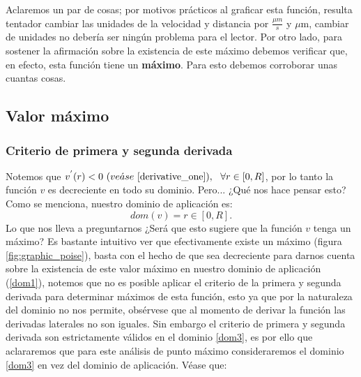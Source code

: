 Aclaremos un par de cosas; por motivos prácticos al graficar esta función, resulta tentador cambiar las unidades de la velocidad y distancia por $\frac{\mu m}{s}$ y $\mu$m, cambiar de unidades no debería ser ningún problema para el lector. Por otro lado, para sostener la  afirmación sobre la existencia de este máximo debemos verificar que, en efecto, esta función tiene un \textbf{máximo}. Para esto debemos corroborar unas cuantas cosas.\\
\subsection{Valor máximo}
\subsubsection{Criterio de primera y segunda derivada}

   \vspace{0.5cm}

Notemos que $v^{'}(r)<0\ (ve\Acute{a}se\ \ref{derivative_one}), \ \ \forall r\in \left[0,R\right]$, por lo tanto la función $v$ es decreciente en todo su dominio. Pero... ¿Qué nos hace pensar esto? Como se menciona, nuestro dominio de aplicación es: 
$$dom(v)=r\in\left[0,R\right].$$ Lo que nos lleva a preguntarnos ¿Será que esto sugiere que la función $v$ tenga un máximo? Es bastante intuitivo ver que efectivamente existe un máximo (figura \ref{fig:graphic_poise}), basta con el hecho de que sea decreciente para darnos cuenta sobre la existencia de este valor máximo en nuestro dominio de aplicación (\ref{dom1}), notemos que no es posible aplicar el criterio de la primera y segunda derivada para determinar máximos de esta función, esto ya que por la naturaleza del dominio no nos permite, obsérvese que al momento de derivar la función las derivadas laterales no son iguales. Sin embargo el criterio de primera y segunda derivada son estrictamente válidos en el dominio \ref{dom3}, es por ello que aclararemos que para este análisis de punto máximo consideraremos el dominio \ref{dom3} en vez del dominio de aplicación. Véase que:

